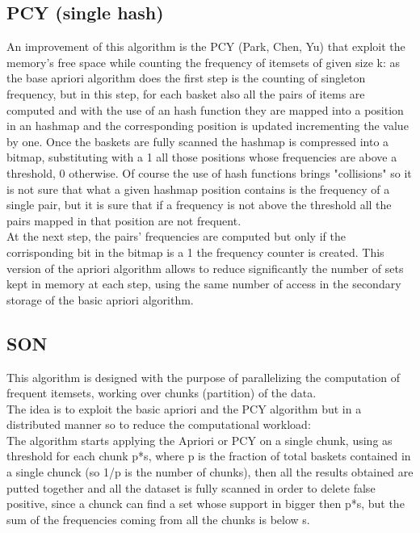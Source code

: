 \documentclass[14pt]{extarticle}
\begin{document}
\subsection{PCY (single hash)}
An improvement of this algorithm is the PCY (Park, Chen, Yu) that exploit the memory's free space while counting the frequency of itemsets of given size k:
as the base apriori algorithm does the first step is the counting of singleton frequency, but in this step, for each basket also all the pairs of items are computed
and with the use of an hash function they are mapped into a position in an hashmap and the corresponding position is updated incrementing the value by one. Once the baskets are fully scanned the hashmap is compressed into a bitmap, substituting with a 1 all those positions whose frequencies are above a threshold, 0 otherwise.
Of course the use of hash functions brings "collisions" so it is not sure that what a given hashmap position contains is the frequency of a single pair, but it is sure that if a frequency is not above the threshold all the pairs mapped in that position are not frequent.\\
At the next step, the pairs' frequencies are computed but only if the corrisponding bit in the bitmap is a 1 the frequency counter is created.
This version of the apriori algorithm allows to reduce significantly the number of sets kept in memory at each step, using the same number of access in the secondary storage of the basic apriori algorithm.
 
\subsection{SON}
This algorithm is designed with the purpose of parallelizing the computation of frequent itemsets, working over chunks (partition) of the data.\\
The idea is to exploit the basic apriori and the PCY algorithm but in a distributed manner so to reduce the computational workload:\\
The algorithm starts applying the Apriori or PCY on a single chunk, using as threshold for each chunk p*s, where p is the fraction of total baskets contained in a single chunck (so 1/p is the number of chunks), then all the results obtained are putted together and all the dataset is fully scanned in order to delete false positive, since a chunck can find a set whose support in bigger then p*s, but the sum of the frequencies coming from all the chunks is below s.
\end{document}
